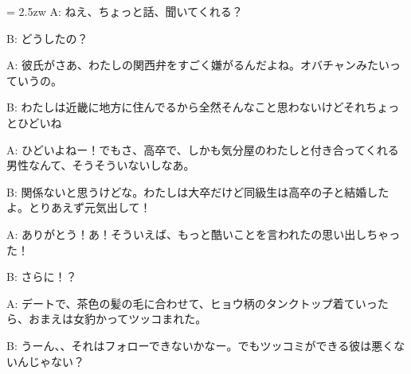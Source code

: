 \documentclass[11pt]{amsart}
\title{}
\author{}
\newenvironment{hangall}[1]{\hangindent = 2.5zw\everypar{\hangindent = 2.5zw}}{}
\begin{document}
\maketitle
\begin{hangall}{}%
A: ねえ、ちょっと話、聞いてくれる？

B: どうしたの？

A: 彼氏がさあ、わたしの関西弁をすごく嫌がるんだよね。オバチャンみたいっていうの。

B: わたしは近畿に地方に住んでるから全然そんなこと思わないけどそれちょっとひどいね

A: ひどいよねー！でもさ、高卒で、しかも気分屋のわたしと付き合ってくれる男性なんて、そうそういないしなあ。

B: 関係ないと思うけどな。わたしは大卒だけど同級生は高卒の子と結婚したよ。とりあえず元気出して！

A: ありがとう！あ！そういえば、もっと酷いことを言われたの思い出しちゃった！

B: さらに！？

A: デートで、茶色の髪の毛に合わせて、ヒョウ柄のタンクトップ着ていったら、おまえは女豹かってツッコまれた。

B: うーん、、それはフォローできないかなー。でもツッコミができる彼は悪くないんじゃない？
\end{hangall}
\end{document}

